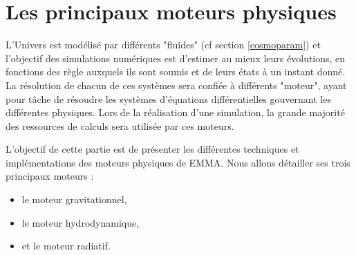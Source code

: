 \chapter{Les principaux moteurs physiques}
\label{sec:solvers}


L'Univers est modélisé par différents "fluides" (cf section \ref{cosmoparam}) et l'objectif des simulations numériques est d'estimer au mieux leurs évolutions, en fonctions des règle auxquels ils sont soumis et de leurs états à un instant donné.
La résolution de chacun de ces systèmes sera confiée à différents "moteur", ayant pour tâche de résoudre les systèmes d'équations différentielles gouvernant les différentes physiques.
Lors de la réalisation d'une simulation, la grande majorité des ressources de calculs sera utilisée par ces moteurs.

L'objectif de cette partie est de présenter les différentes techniques et implémentations des moteurs physiques de EMMA.
Nous allons détailler ses trois principaux moteurs  :
\begin{itemize}
\item le moteur gravitationnel,
\item le moteur hydrodynamique,
\item et le moteur radiatif.
\end{itemize}



